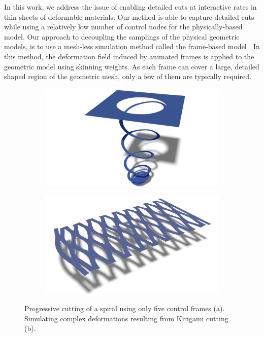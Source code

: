 In this work, we address the issue of enabling detailed cuts at interactive rates in  thin sheets of deformable materials. Our method is able to capture detailed cuts while using a relatively low number of control nodes for the physically-based model.
Our approach to decoupling the samplings of the physical geometric models, is to use a mesh-less simulation method called the frame-based model \cite{Gilles2011}. In this method, the deformation field induced by animated frames is applied to the geometric model using skinning weights. As each frame can cover a large, detailed shaped region of the geometric mesh, only a few of them are typically required.

\begin{figure}[t]
\centering
\begin{subfigure}[b]{0.45\linewidth}
\includegraphics[width=\linewidth]{images/cutting-mig2015/Spiral2.pdf}
\caption{\label{fig:spiral}}
\end{subfigure}
\hfill
\begin{subfigure}[b]{0.45\linewidth}
\includegraphics[width=\linewidth]{images/cutting-mig2015/Kirigami.pdf}
\caption{\label{fig:kirigami}}
\end{subfigure}
\caption[Frame-based cutting: Spiral and Kirigami cutting examples]{\label{fig:teaser} Progressive cutting of a spiral using only five control frames (a). Simulating complex deformations resulting from Kirigami cutting (b).}
\end{figure}

